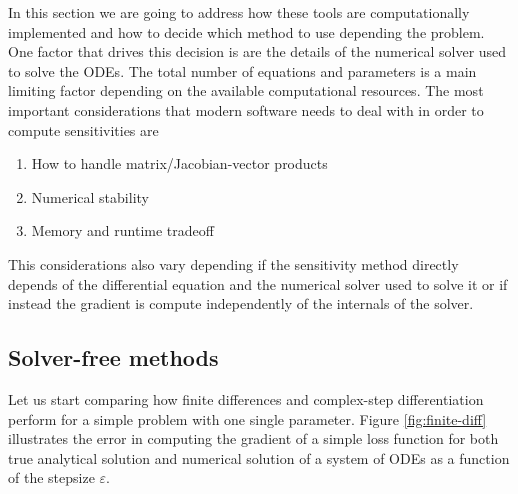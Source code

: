 
In this section we are going to address how these tools are computationally implemented and how to decide which method to use depending the problem. 
One factor that drives this decision is are the details of the numerical solver used to solve the ODEs. 
The total number of equations and parameters is a main limiting factor depending on  the available computational resources. 
The most important considerations that modern software needs to deal with in order to compute sensitivities are 
\begin{enumerate}
    \item How to handle matrix/Jacobian-vector products
    \item Numerical stability
    \item Memory and runtime tradeoff
\end{enumerate}
This considerations also vary depending if the sensitivity method directly depends of the differential equation and the numerical solver used to solve it or if instead the gradient is compute independently of the internals of the solver. 


\subsection{Solver-free methods}

Let us start comparing how finite differences and complex-step differentiation perform for a simple problem with one single parameter. 
Figure \ref{fig:finite-diff} illustrates the error in computing the gradient of a simple loss function for both true analytical solution and numerical solution of a system of ODEs as a function of the stepsize $\varepsilon$.

